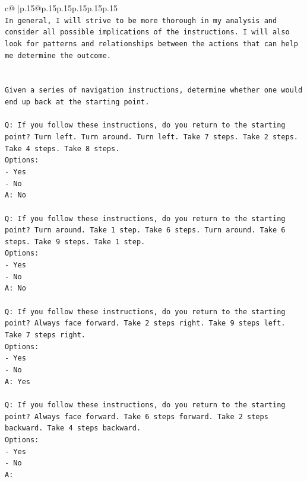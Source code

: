 \documentclass{article}
\begin{document}
{\begin{supertabular}{c@{$\;$}|p{.15\linewidth}@{}p{.15\linewidth}p{.15\linewidth}p{.15\linewidth}p{.15\linewidth}p{.15\linewidth}}
{{{\\ 
\texttt{In general, I will strive to be more thorough in my analysis and consider all possible implications of the instructions. I will also look for patterns and relationships between the actions that can help me determine the outcome.} \\
\\ 
\\ 
\texttt{Given a series of navigation instructions, determine whether one would end up back at the starting point.} \\
\\ 
\texttt{Q: If you follow these instructions, do you return to the starting point? Turn left. Turn around. Turn left. Take 7 steps. Take 2 steps. Take 4 steps. Take 8 steps.} \\
\texttt{Options:} \\
\texttt{{-} Yes} \\
\texttt{{-} No} \\
\texttt{A: No} \\
\\ 
\texttt{Q: If you follow these instructions, do you return to the starting point? Turn around. Take 1 step. Take 6 steps. Turn around. Take 6 steps. Take 9 steps. Take 1 step.} \\
\texttt{Options:} \\
\texttt{{-} Yes} \\
\texttt{{-} No} \\
\texttt{A: No} \\
\\ 
\texttt{Q: If you follow these instructions, do you return to the starting point? Always face forward. Take 2 steps right. Take 9 steps left. Take 7 steps right.} \\
\texttt{Options:} \\
\texttt{{-} Yes} \\
\texttt{{-} No} \\
\texttt{A: Yes} \\
\\ 
\texttt{Q: If you follow these instructions, do you return to the starting point? Always face forward. Take 6 steps forward. Take 2 steps backward. Take 4 steps backward.} \\
\texttt{Options:} \\
\texttt{{-} Yes} \\
\texttt{{-} No} \\
\texttt{A:} \\
            }
        }
    }
     \\ \\


\end{supertabular}}
\end{document}
